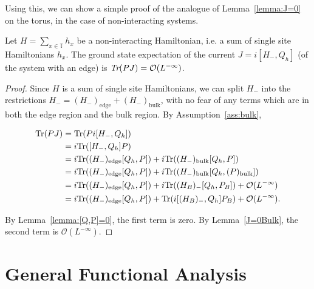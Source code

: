 \documentclass[12pt, letterpaper]{article}
\begin{document}
Using this, we can show a simple proof of the analogue of Lemma~\ref{lemma:J=0} on the torus, in the case of non-interacting systems.

\begin{proposition}
Let $H = \sum_{x \in \mathbb{T}} h_x$ be a non-interacting Hamiltonian, i.e. a sum of single site Hamiltonians $h_x$. The ground state expectation of the current $J=i[H_-, Q_h]$ (of the system with an edge) is $\emph{Tr}(PJ)=\mathcal{O}(L^{-\infty})$.
\label{prop:J=0Torus}
\end{proposition}

\begin{proof}

Since $H$ is a sum of single site Hamiltonians, we can split $H_-$ into the restrictions $H_- = (H_-)_\text{edge} + (H_-)_\text{bulk}$, with no fear of any terms which are in both the edge region and the bulk region. By Assumption~\ref{ass:bulk},

\[\begin{aligned}
\text{Tr}(PJ) &= \text{Tr}(Pi[H_-, Q_h])\\
&= i\text{Tr}([H_-, Q_h]P)\\
&= i\text{Tr}((H_-)_\text{edge} [Q_h, P]) + i \text{Tr}((H_-)_\text{bulk} [Q_h, P])\\
&= i\text{Tr}((H_-)_\text{edge} [Q_h, P]) + i \text{Tr}((H_-)_\text{bulk} [Q_h, (P)_\text{bulk}])\\
&= i\text{Tr}((H_-)_\text{edge} [Q_h, P]) + i \text{Tr}((H_B)_-[Q_h, P_B]) + \mathcal{O}(L^{-\infty})\\
&= i\text{Tr}((H_-)_\text{edge} [Q_h, P]) + \text{Tr}(i[(H_B)_-, Q_h]P_B) + \mathcal{O}(L^{-\infty}).
\end{aligned}\]

By Lemma~\ref{lemma:[Q,P]=0}, the first term is zero. By Lemma~\ref{J=0Bulk}, the second term is $\mathcal{O}(L^{-\infty})$. 
\end{proof}

\newpage
\appendix

\section{General Functional Analysis}
\end{document}
